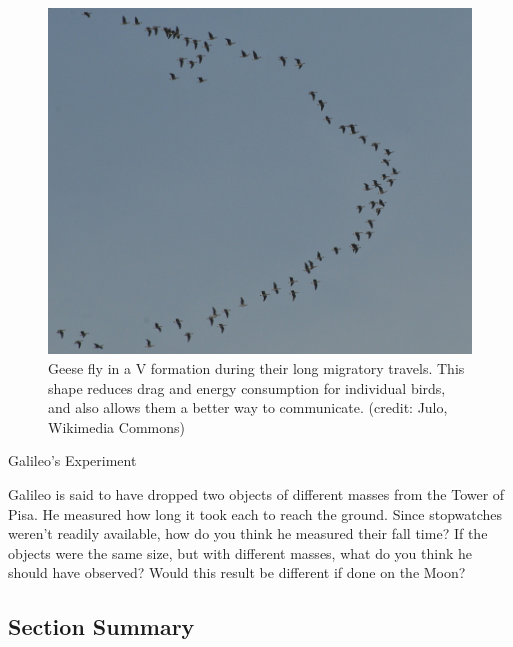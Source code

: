 \documentclass[
]{book}
\newenvironment{note}{}{}
\begin{document}
\begin{figure}
\hypertarget{import-auto-id1165298645387}{%
\centering
\includegraphics{images/Figure_06_02_06a.jpg}
\caption{Geese fly in a V formation during their long migratory travels. This
shape reduces drag and energy consumption for individual birds, and also
allows them a better way to communicate. (credit: Julo, Wikimedia
Commons)}\label{import-auto-id1165298645387}
}
\end{figure}

\hypertarget{fs-id1165298544129}{}
\begin{note}

Galileo's Experiment

Galileo is said to have dropped two objects of different masses from the
Tower of Pisa. He measured how long it took each to reach the ground.
Since stopwatches weren't readily available, how do you think he
measured their fall time? If the objects were the same size, but with
different masses, what do you think he should have observed? Would this
result be different if done on the Moon?

\end{note}

\hypertarget{fs-id1165298931707-summary}{}
\hypertarget{section-summary-15}{%
\subsection{Section Summary}\label{section-summary-15}}
\end{document}

